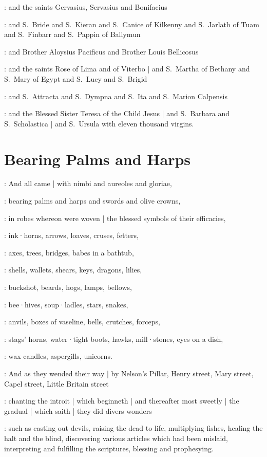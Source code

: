 :
and the saints Gervasius,
Servasius
and Bonifacius

:
and S.~Bride
and S.~Kieran
and S.~Canice of Kilkenny
and S.~Jarlath of Tuam
and S.~Finbarr
and S.~Pappin of Ballymun

:
and Brother Aloysius Pacificus
and Brother Louis Bellicosus

:
and the saints Rose of Lima
and of Viterbo |
and S.~Martha of Bethany
and S.~Mary of Egypt
and S.~Lucy
and S.~Brigid

:
and S.~Attracta
and S.~Dympna
and S.~Ita
and S.~Marion Calpensis

:
and the Blessed Sister Teresa of the Child Jesus |
and S.~Barbara
and S.~Scholastica |
and S.~Ursula with eleven thousand virgins.


\section{Bearing Palms and Harps}

:
And all came |
with nimbi and aureoles and gloriae,

:
bearing palms and harps and swords and olive crowns,

:
in robes whereon were woven |
the blessed symbols of their efficacies,

:
ink·horns,
arrows,
loaves,
cruses,
fetters,

:
axes,
trees,
bridges,
babes in a bathtub,

:
shells,
wallets,
shears,
keys,
dragons,
lilies,

:
buckshot,
beards,
hogs,
lamps,
bellows,

:
bee·hives,
soup·ladles,
stars,
snakes,

:
anvils,
boxes of vaseline,
bells,
crutches,
forceps,

:
stags' horns,
water·tight boots,
hawks,
mill·stones,
eyes on a dish,

:
wax candles,
aspergills,
unicorns.

:
And as they wended their way |
by Nelson's Pillar,
Henry street,
Mary street,
Capel street,
Little Britain street

:
chanting the introit  |
which beginneth
 |
and thereafter most sweetly |
the gradual  |
which saith  |
they did divers wonders

:
such as casting out devils,
raising the dead to life,
multiplying fishes,
healing the halt and the blind,
discovering various articles which had been mislaid,
interpreting and fulfilling the scriptures,
blessing and prophesying.


